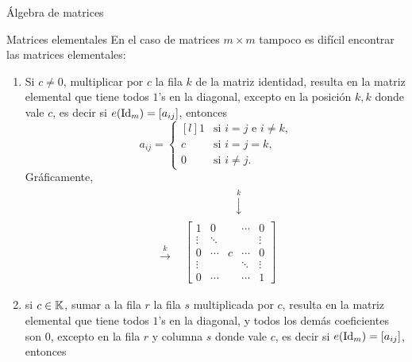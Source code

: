 \begin{chapter}{\'Algebra de matrices}
\begin{section}{Matrices elementales}
            En el caso de matrices $m \times m$ tampoco es difícil encontrar las matrices elementales:
            \begin{enumerate}
                \item Si $c \not=0$, multiplicar por  $c$ la fila $k$ de la matriz identidad, resulta en la matriz elemental que tiene todos $1$'s en la diagonal, excepto en la posición $k,k$ donde vale $c$,  es decir si $e(\operatorname{Id}_m) = [a_{ij}]$,  entonces
                \begin{equation}\label{elem-tipo-1}
                a_{ij} = \left\{ 
                \begin{matrix*}[l]
                1 &\text{si $i=j$ e $i\ne k$,}\\
                c &\text{si $i=j=k$,} \\
                0 \quad&\text{si $i \ne j$.}
                \end{matrix*}\right.
                \end{equation}
                Gráficamente,
                \begin{align*}
                &\begin{matrix}
                {}^{}&{}^{}&{}^{}&{}^{}&{}^{}&\overset{k}{\downarrow}&{}^{}&{}^{}&{}^{}
                \end{matrix} \\
                \begin{matrix}
                {}^{}\\
                {}^{}\\
                \overset{k}{\to}\\
                {}^{}\\
                {}^{}
                \end{matrix}
                &\begin{bmatrix}
                1 & 0 &  &\cdots & 0  \\
                \vdots  & \ddots  & & & \vdots \\
                0 & \cdots &c &\cdots &0 \\
                \vdots  &   & &\ddots & \vdots \\
                0  & \cdots  & &\cdots & 1
                \end{bmatrix}
                \end{align*}
                \item si  $c \in \mathbb K$, sumar a la fila $r$  la fila $s$ multiplicada por $c$, resulta en la matriz elemental que tiene todos $1$'s en la diagonal, y todos los demás coeficientes son $0$,  excepto en la fila  $r$ y columna $s$ donde  vale $c$,  es decir si $e(\operatorname{Id}_m) = [a_{ij}]$,  entonces

\end{enumerate}
\end{section}
\end{chapter}
